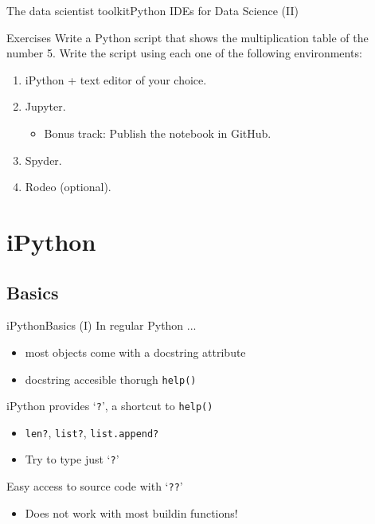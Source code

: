 \documentclass[10pt,compress]{beamer} %
\begin{document}
\begin{frame}{The data scientist toolkit}{Python IDEs for Data Science (II)}
    \begin{block}{Exercises}
		Write a Python script that shows the multiplication table of the number 5. Write the script using each one of the following environments:
   		\begin{enumerate}
   		\item iPython + text editor of your choice.
		\item Jupyter. 
            \begin{itemize}
                \item Bonus track: Publish the notebook in GitHub.
            \end{itemize}
		\item Spyder.
		\item Rodeo (optional).
		\end{enumerate}
	\end{block}
\end{frame}

\section{iPython}
\subsection{Basics}

\begin{frame}{iPython}{Basics (I)}
    In regular Python ...
    \begin{itemize}
        \item most objects come with a docstring attribute
        \item docstring accesible thorugh \texttt{help()}
    \end{itemize}
    iPython provides `\texttt{?}', a shortcut to \texttt{help()}
    \begin{itemize}
        \item \texttt{len?}, \texttt{list?}, \texttt{list.append?}
        \item Try to type just `\texttt{?}'
    \end{itemize}
    Easy access to source code with `\texttt{??}'
    \begin{itemize}
        \item Does not work with most buildin functions!
    \end{itemize}
\end{frame}
\end{document}
